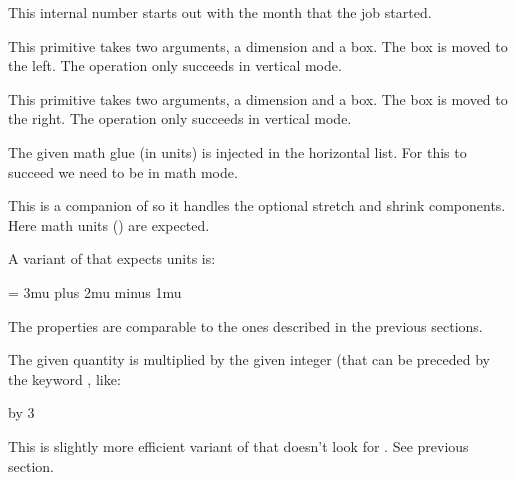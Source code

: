 \stopoldprimitive

\startoldprimitive[title={\prm {month}}]

This internal number starts out with the month that the job started.

\stopoldprimitive

\startoldprimitive[title={\prm {moveleft}}]

This primitive takes two arguments, a dimension and a box. The box is moved to
the left. The operation only succeeds in vertical mode.

\stopoldprimitive

\startoldprimitive[title={\prm {moveright}}]

This primitive takes two arguments, a dimension and a box. The box is moved to
the right. The operation only succeeds in vertical mode.

\stopoldprimitive

\startoldprimitive[title={\prm {mskip}}]

The given math glue (in  units) is injected in the horizontal list. For
this to succeed we need to be in math mode.

\stopoldprimitive

\startoldprimitive[title={\prm {muexpr}}]

This is a companion of  so it handles the optional stretch and
shrink components. Here math units () are expected.

\stopoldprimitive

\startnewprimitive[title={\prm {mugluespecdef}}]

A variant of  that expects  units is:

\starttyping
\mugluespecdef\MyGlue = 3mu plus 2mu minus 1mu
\stoptyping

The properties are comparable to the ones described in the previous sections.

\stopnewprimitive

\startoldprimitive[title={\prm {multiply}}]

The given quantity is multiplied by the given integer (that can be preceded by
the keyword , like:

\starttyping
\scratchdimen=10pt \multiply\scratchdimen by 3
\stoptyping

\stopoldprimitive

\startnewprimitive[title={\prm {multiplyby}}]

This is slightly more efficient variant of  that doesn't look for
. See previous section.

